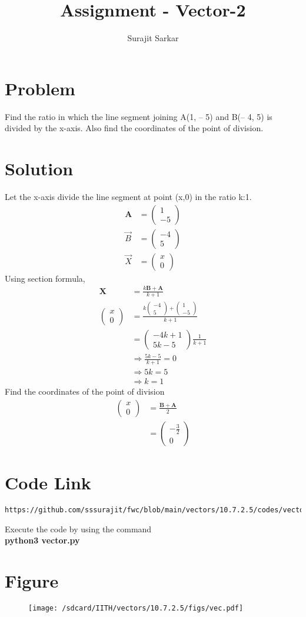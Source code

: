 \documentclass[journal,12pt,twocolumn]{IEEEtran}
\title{\mytitle}
\title{
Assignment - Vector-2
}
\author{Surajit Sarkar}
\newcommand{\myvec}[1]{\ensuremath{\begin{pmatrix}#1\end{pmatrix}}}
\let\vec\mathbf
\begin{document}
\maketitle
\tableofcontents
\bigskip
\section{\textbf{Problem}}
Find the ratio in which the line segment joining A(1, – 5) and B(– 4, 5) is divided by the
x-axis. Also find the coordinates of the point of division.
\section{\textbf{Solution}}
Let the x-axis divide the line segment at point (x,0) in the ratio k:1.
\begin{align}
\vec{A}&=\myvec{1 \\ -5} \\ 
\Vec{B}&=\myvec{-4 \\ 5} \\ 
\Vec{X}&=\myvec{x\\0}
\end{align}
Using section formula,
\begin{align}
\vec{X}&=\frac{k\vec{B}+\vec{A}}{k+1}\\
\myvec{x\\0}&=\frac{k\myvec{-4\\5}+\myvec{1\\-5}}{k+1}\\
&=\myvec{-4k+1\\5k-5}\frac{1}{k+1}\\
&\Rightarrow \frac{5k-5}{k+1}=0\\
&\Rightarrow 5k=5\\
&\Rightarrow k=1
\end{align}
Find the coordinates of the point of division
\begin{align}
    \myvec{x\\0}&=\frac{\vec{B}+\vec{A}}{2}\\
    &=\myvec{-\frac{3}{2}\\0}
\end{align}
\section{\textbf{Code Link}}
\begin{lstlisting}
https://github.com/sssurajit/fwc/blob/main/vectors/10.7.2.5/codes/vector.py
\end{lstlisting}
Execute the code by using the command\\
\textbf{python3 vector.py}
\section{\textbf{Figure}}
\begin{figure}[!h]
\centering
\texttt{[image: /sdcard/IITH/vectors/10.7.2.5/figs/vec.pdf]}
\caption{}
\label{fig:vec}
\end{figure}
\end{document}
